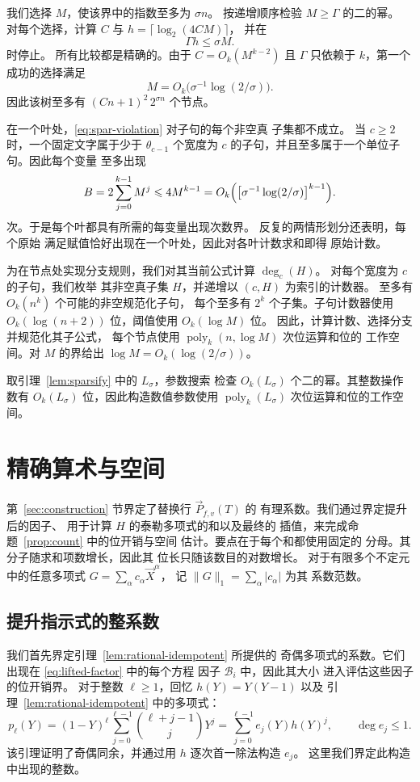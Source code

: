 \documentclass[11pt,reqno]{amsart}
\numberwithin{equation}{section}
\theoremstyle{definition}\newtheorem{definition}[theorem]{定义}
\theoremstyle{remark}\newtheorem{remark}[theorem]{注}
\newcommand{\poly}{\operatorname{poly}}
\renewcommand{\le}{\leqslant}
\renewcommand{\ge}{\geqslant}
\begin{document}
我们选择 $M$，使该界中的指数至多为 $\sigma n$。
按递增顺序检验 $M\ge\Gamma$ 的二的幂。
对每个选择，计算 $C$ 与 $h=\lceil\log_2(4CM)\rceil$，
并在
\[
 \Gamma h\le\sigma M.
\]
时停止。
所有比较都是精确的。由于 $C=O_k(M^{k-2})$ 且 $\Gamma$
只依赖于 $k$，第一个成功的选择满足
\[
 M=O_k\bigl(\sigma^{-1}\log(2/\sigma)\bigr).
\]
因此该树至多有 $(Cn+1)^2\,2^{\sigma n}$ 个节点。

在一个叶处，\eqref{eq:spar-violation} 对子句的每个非空真
子集都不成立。
当 $c\ge2$ 时，一个固定文字属于少于 $\theta_{c-1}$ 个宽度为 $c$
的子句，并且至多属于一个单位子句。因此每个变量
至多出现
\[
 B=2\sum_{j=0}^{k-1}M^j
   \le4M^{k-1}
   =O_k\Bigl(\bigl[\sigma^{-1}\log(2/\sigma)\bigr]^{k-1}\Bigr).
\]
次。于是每个叶都具有所需的每变量出现次数界。
反复的两情形划分还表明，每个原始
满足赋值恰好出现在一个叶处，因此对各叶计数求和即得
原始计数。

为在节点处实现分支规则，我们对其当前公式计算 $\deg_c(H)$。
对每个宽度为 $c$ 的子句，我们枚举
其非空真子集 $H$，并递增以 $(c,H)$ 为索引的计数器。
至多有 $O_k(n^k)$ 个可能的非空规范化子句，
每个至多有 $2^k$ 个子集。子句计数器使用
$O_k(\log(n+2))$ 位，阈值使用 $O_k(\log M)$ 位。
因此，计算计数、选择分支并规范化其子公式，
每个节点使用 $\poly_k(n,\log M)$ 次位运算和位的
工作空间。对 $M$ 的界给出
$\log M=O_k(\log(2/\sigma))$。

取引理~\ref{lem:sparsify} 中的 $L_\sigma$，参数搜索
检查 $O_k(L_\sigma)$ 个二的幂。其整数操作数有
$O_k(L_\sigma)$ 位，因此构造数值参数使用
$\poly_k(L_\sigma)$ 次位运算和位的工作空间。

\section{精确算术与空间}\label{app:arithmetic}
第~\ref{sec:construction} 节界定了替换行 $\vec{P}_{f,v}(T)$ 的
有理系数。我们通过界定提升后的因子、
用于计算 $H$ 的泰勒多项式的和以及最终的
插值，来完成命题~\ref{prop:count} 中的位开销与空间
估计。要点在于每个和都使用固定的
分母。其分子随求和项数增长，因此其
位长只随该数目的对数增长。
对于有限多个不定元中的任意多项式 $G=\sum_\alpha c_\alpha \vec{X}^{\alpha}$，
记 $\|G\|_1=\sum_\alpha|c_\alpha|$ 为其
系数范数。

\subsection{提升指示式的整系数}
\label{subsec:rational-lift-height}
我们首先界定引理~\ref{lem:rational-idempotent} 所提供的
奇偶多项式的系数。它们出现在 \eqref{eq:lifted-factor} 中的每个方程
因子 $\mathcal B_i$ 中，因此其大小
进入评估这些因子的位开销界。
对于整数 $\ell\ge1$，回忆 $h(Y)=Y(Y-1)$ 以及
引理~\ref{lem:rational-idempotent} 中的多项式：
\[
 p_\ell(Y)=(1-Y)^\ell\sum_{j=0}^{\ell-1}
                    \binom{\ell+j-1}{j}Y^j
          =\sum_{j=0}^{\ell-1}e_j(Y)h(Y)^j,
 \qquad \deg e_j\le1.
\]
该引理证明了奇偶同余，并通过用 $h$ 逐次首一除法构造 $e_j$。
这里我们界定此构造中出现的整数。
\end{document}
